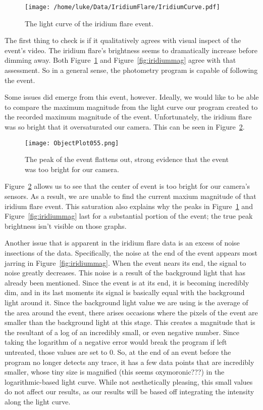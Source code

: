 \begin{figure}[ht!]
	\centering
	\texttt{[image: /home/luke/Data/IridiumFlare/IridiumCurve.pdf]}
	\caption{The light curve of the iridium flare event.}
	\label{fig:iridiumcurve}
\end{figure}

The first thing to check is if it qualitatively agrees with visual inspect of the event's video. The iridium flare's brightness seems to dramatically increase before dimming away. Both Figure~\ref{fig:iridiumcurve} and Figure~\ref{fig:iridiummag} agree with that assessment. So in a general sense, the photometry program is capable of following the event.

Some issues did emerge from this event, however. Ideally, we would like to be able to compare the maximum magnitude from the light curve our program created to the recorded maximum magnitude of the event. Unfortunately, the iridium flare was so bright that it oversaturated our camera. This can be seen in Figure~\ref{fig:ObjectPlot055}.

\begin{figure}[ht!]
	\centering
	\texttt{[image: ObjectPlot055.png]}
	\caption{The peak of the event flattens out, strong evidence that the event was too bright for our camera.}
	\label{fig:ObjectPlot055}
\end{figure}

Figure~\ref{fig:ObjectPlot055} allows us to see that the center of event is too bright for our camera's sensors. As a result, we are unable to find the current maxium magnitude of that iridium flare event. This saturation also explains why the peaks in Figure~\ref{fig:iridiumcurve} and Figure~\ref{fig:iridiummag} last for a substantial portion of the event; the true peak brightness isn't visible on those graphs. 

Another issue that is apparent in the iridium flare data is an excess of noise insections of the data. Specifically, the noise at the end of the event appears most jarring in Figure~\ref{fig:iridiummag}. When the event nears its end, the signal to noise greatly decreases. This noise is a result of the background light that has already been mentioned. Since the event is at its end, it is becoming incredibly dim, and in its last moments its signal is basically equal with the background light around it. Since the background light value we are using is the average of the area around the event, there arises occasions where the pixels of the event are smaller than the background light at this stage. This creates a magnitude that is the resultant of a log of an incredibly small, or even negative number. Since taking the logarithm of a negative error would break the program if left untreated, those values are set to 0. So, at the end of an event before the program no longer detects any trace, it has a few data points that are incredibly smaller, whose tiny size is magnified (this seems oxymoronic???) in the logarithmic-based light curve. While not aesthetically pleasing, this small values do not affect our results, as our results will be based off integrating the intensity along the light curve.

